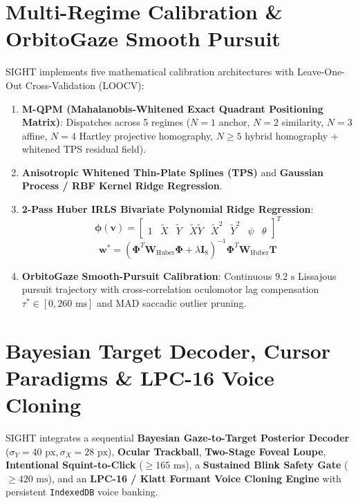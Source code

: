 \documentclass[twocolumn,10pt]{article}
\begin{document}
\section{Multi-Regime Calibration \& OrbitoGaze Smooth Pursuit}
SIGHT implements five mathematical calibration architectures with Leave-One-Out Cross-Validation (LOOCV):
\begin{enumerate}
    \item \textbf{M-QPM (Mahalanobis-Whitened Exact Quadrant Positioning Matrix)}: Dispatches across 5 regimes ($N=1$ anchor, $N=2$ similarity, $N=3$ affine, $N=4$ Hartley projective homography, $N \ge 5$ hybrid homography + whitened TPS residual field).
    \item \textbf{Anisotropic Whitened Thin-Plate Splines (TPS)} and \textbf{Gaussian Process / RBF Kernel Ridge Regression}.
    \item \textbf{2-Pass Huber IRLS Bivariate Polynomial Ridge Regression}:
    \begin{equation}
    \boldsymbol{\phi}(\mathbf{v}) = \begin{bmatrix} 1 & \tilde{X} & \tilde{Y} & \tilde{X}\tilde{Y} & \tilde{X}^2 & \tilde{Y}^2 & \psi & \theta \end{bmatrix}^T
    \end{equation}
    \begin{equation}
    \mathbf{w}^* = \left(\mathbf{\Phi}^T \mathbf{W}_{\text{Huber}} \mathbf{\Phi} + \lambda \mathbf{I}_8\right)^{-1} \mathbf{\Phi}^T \mathbf{W}_{\text{Huber}} \mathbf{T}
    \end{equation}
    \item \textbf{OrbitoGaze Smooth-Pursuit Calibration}: Continuous $9.2\text{ s}$ Lissajous pursuit trajectory with cross-correlation oculomotor lag compensation $\tau^* \in [0, 260\text{ ms}]$ and MAD saccadic outlier pruning.
\end{enumerate}

\section{Bayesian Target Decoder, Cursor Paradigms \& LPC-16 Voice Cloning}
SIGHT integrates a sequential \textbf{Bayesian Gaze-to-Target Posterior Decoder} ($\sigma_Y = 40\text{ px}, \sigma_X = 28\text{ px}$), \textbf{Ocular Trackball}, \textbf{Two-Stage Foveal Loupe}, \textbf{Intentional Squint-to-Click} ($\ge 165\text{ ms}$), a \textbf{Sustained Blink Safety Gate} ($\ge 420\text{ ms}$), and an \textbf{LPC-16 / Klatt Formant Voice Cloning Engine} with persistent \texttt{IndexedDB} voice banking.
\end{document}

